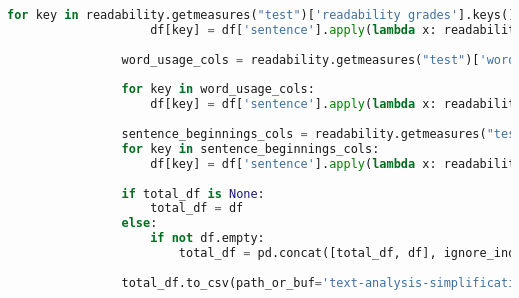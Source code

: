 \begin{center}
\begin{lstlisting}[language=Python, caption={Script voor text-analyse met Readability}, label={code:script-for-text-analysis}]
				for key in readability.getmeasures("test")['readability grades'].keys():
					df[key] = df['sentence'].apply(lambda x: readability.getmeasures(x)['readability grades'][key])
		
				word_usage_cols = readability.getmeasures("test")['word usage'].keys()
		
				for key in word_usage_cols:
					df[key] = df['sentence'].apply(lambda x: readability.getmeasures(x, lang=lang)['word usage'][key])
		
				sentence_beginnings_cols = readability.getmeasures("test")['sentence beginnings'].keys()
				for key in sentence_beginnings_cols:
					df[key] = df['sentence'].apply(lambda x: readability.getmeasures(x, lang=lang)['sentence beginnings'][key])
		
				if total_df is None:
					total_df = df
				else:
					if not df.empty:
						total_df = pd.concat([total_df, df], ignore_index=True)
		
				total_df.to_csv(path_or_buf='text-analysis-simplification.csv', index=False)
	\end{lstlisting}
\end{center}
